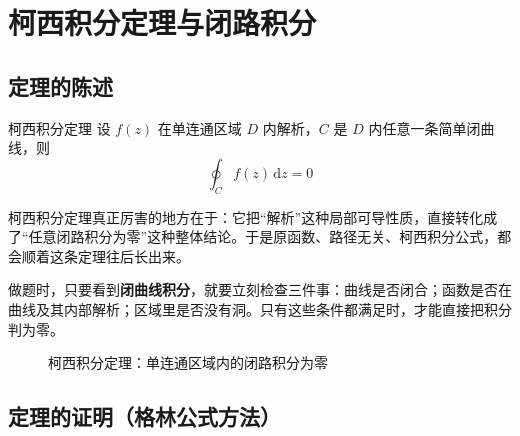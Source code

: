 \section{柯西积分定理与闭路积分}

\subsection{定理的陈述}

\begin{dingli}{柯西积分定理}{}
设 $f(z)$ 在单连通区域 $D$ 内解析，$C$ 是 $D$ 内任意一条简单闭曲线，则
\[
    \oint_C f(z)\,\mathrm{d}z = 0
\]
\end{dingli}

\begin{tishi}[这条定理为什么是全章枢纽]
柯西积分定理真正厉害的地方在于：它把``解析''这种局部可导性质，直接转化成了``任意闭路积分为零''这种整体结论。于是原函数、路径无关、柯西积分公式，都会顺着这条定理往后长出来。

做题时，只要看到\textbf{闭曲线积分}，就要立刻检查三件事：曲线是否闭合；函数是否在曲线及其内部解析；区域里是否没有洞。只有这些条件都满足时，才能直接把积分判为零。
\end{tishi}

\begin{figure}[htbp]
\centering
{}
\caption{柯西积分定理：单连通区域内的闭路积分为零}
\label{fig:cauchy-thm}
\end{figure}

\subsection{定理的证明（格林公式方法）}

